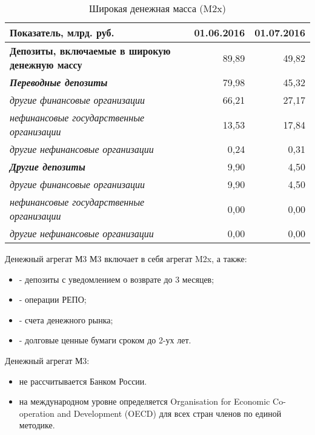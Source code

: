 \documentclass[_DKB_p1_Money.tex]{subfiles}
\begin{document}
\begin{frame}[shrink=25]
\begin{table}[htbp]
\caption{Широкая денежная масса (M2x)}
  \centering
  	\begin{tabularx}{\linewidth}[b]{@{}>{\raggedright\arraybackslash}Xrr@{}}
    \toprule
    Показатель, млрд. руб. & 01.06.2016 & 01.07.2016 \\
    \midrule
    \textbf{Депозиты, включаемые в широкую денежную массу} & 89,89 & 49,82 \\
    \textit{\textbf{Переводные депозиты}} & 79,98 & 45,32 \\
    \textit{ другие финансовые организации} & 66,21 & 27,17 \\
    \textit{ нефинансовые государственные  организации} & 13,53 & 17,84 \\
    \textit{ другие нефинансовые организации} & 0,24  & 0,31 \\
    \textit{\textbf{Другие депозиты}} & 9,90  & 4,50 \\
    \textit{ другие финансовые организации} & 9,90  & 4,50 \\
    \textit{ нефинансовые государственные  организации} & 0,00  & 0,00 \\
    \textit{ другие нефинансовые организации} & 0,00  & 0,00 \\
    \bottomrule
    \end{tabularx}%
  \label{tab:addlabel}%
\end{table}%

\end{frame}

\begin{frame}{Денежный агрегат М3}
М3 включает в себя агрегат M2x, а также:
\begin{itemize}
\item
- депозиты с уведомлением о возврате до 3 месяцев;

\item
- операции РЕПО;

\item
- счета денежного рынка;

\item
- долговые ценные бумаги сроком до 2-ух лет.
\end{itemize}
Денежный агрегат М3:
\begin{itemize}
\item
не рассчитывается Банком России. 

\item
на международном уровне определяется Organisation for Economic Co-operation and Development (OECD) для всех стран членов  по единой методике.
\end{itemize}
\end{frame}
\end{document}
